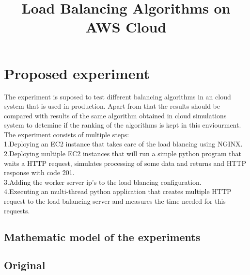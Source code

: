 \documentclass[conference]{IEEEtran}
\begin{document}
\title{Load Balancing Algorithms on AWS Cloud\\}

\author{}

\maketitle

\section{Proposed experiment}
The experiment is suposed to test different balancing algorithms in an cloud system that is used in production.
Apart from that the results should be compared with results of the same algorithm obtained in cloud simulations system to detemine if the ranking of the algorithms is kept in this enviourment.
\\The experiment consists of multiple steps:
\\1.Deploying an EC2 instance that takes care of the load blancing using NGINX.
\\2.Deploying multiple EC2 instances that will run a simple python program that waits a HTTP request, simulates processing of some data and returns and HTTP response with code 201.
\\3.Adding the worker server ip's to the load blancing configuration.
\\4.Executing an multi-thread python application that creates multiple HTTP request to the load balancing server and measures the time needed for this requests.

\subsection{Mathematic model of the experiments}

\subsection{Original }
\end{document}
